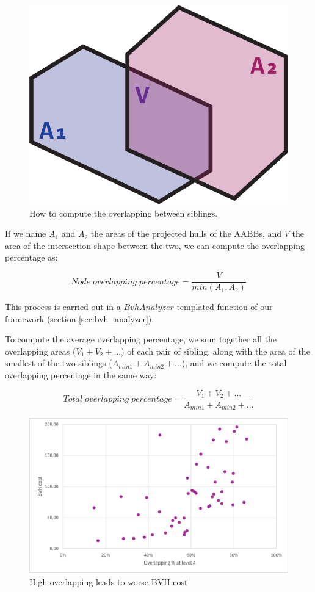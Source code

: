 \documentclass{PoliMi_MasterThesis}
\begin{document}
\begin{figure}[H] 
	\centering
	\includegraphics[width=\textwidth*\real{0.25}]{Images/overlapping.png}
	\caption{How to compute the overlapping between siblings.}
	\label{fig:pah_overlapping_siblings}
\end{figure}

If we name $A_1$ and $A_2$ the areas of the projected hulls of the AABBs, and $V$ the area of the intersection shape between the two, we can compute the overlapping percentage as:

$$Node \; overlapping \; percentage = \frac{V}{min(A_1, A_2)}$$

This process is carried out in a $BvhAnalyzer$ templated function of our framework (section \ref{sec:bvh_analyzer}).

To compute the average overlapping percentage, we sum together all the overlapping areas ($V_1 + V_2 + ...$) of each pair of sibling, along with the area of the smallest of the two siblings ($A_{min1} + A_{min2} + ...$), and we compute the total overlapping percentage in the same way:

$$Total \; overlapping \; percentage = \frac{V_1 + V_2 + ...}{A_{min1} + A_{min2} + ...}$$

\begin{figure}[H] 
	\centering
	\includegraphics[width=\textwidth]{Images/overlapping_quality_scatter.png}
	\caption{High overlapping leads to worse BVH cost.}
	\label{fig:overlapping_scatter}
\end{figure}
\end{document}
